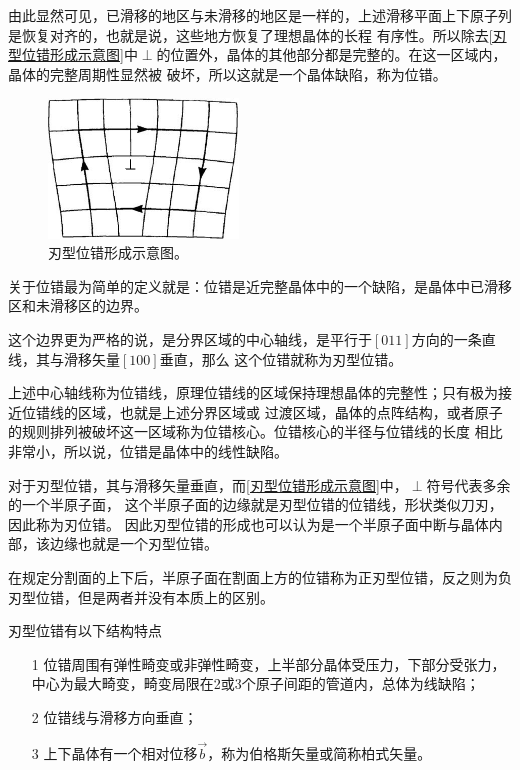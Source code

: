                 由此显然可见，已滑移的地区与未滑移的地区是一样的，上述滑移平面上下原子列是恢复对齐的，也就是说，这些地方恢复了理想晶体的长程
                有序性。所以除去\autoref{刃型位错形成示意图}中$\perp$的位置外，晶体的其他部分都是完整的。在这一区域内，晶体的完整周期性显然被
                破坏，所以这就是一个晶体缺陷，称为位错。
                \begin{figure}[ht]
                    \centering
                    \includegraphics[width=0.45\textwidth]{fig/b_edge_dislocation.eps}
                    \caption{刃型位错形成示意图。}
                    \label{刃型位错形成示意图}
                \end{figure}

                关于位错最为简单的定义就是：位错是近完整晶体中的一个缺陷，是晶体中已滑移区和未滑移区的边界。
                
                这个边界更为严格的说，是分界区域的中心轴线，是平行于$[011]$方向的一条直线，其与滑移矢量$[100]$垂直，那么
                这个位错就称为刃型位错。

                上述中心轴线称为位错线，原理位错线的区域保持理想晶体的完整性；只有极为接近位错线的区域，也就是上述分界区域或
                过渡区域，晶体的点阵结构，或者原子的规则排列被破坏这一区域称为位错核心。位错核心的半径与位错线的长度
                相比非常小，所以说，位错是晶体中的线性缺陷。

                对于刃型位错，其与滑移矢量垂直，而\autoref{刃型位错形成示意图}中，$\perp$符号代表多余的一个半原子面，
                这个半原子面的边缘就是刃型位错的位错线，形状类似刀刃，因此称为刃位错。
                因此刃型位错的形成也可以认为是一个半原子面中断与晶体内部，该边缘也就是一个刃型位错。

                在规定分割面的上下后，半原子面在割面上方的位错称为正刃型位错，反之则为负刃型位错，但是两者并没有本质上的区别。

                刃型位错有以下结构特点
                \begin{itemize}
                    \item[1] 位错周围有弹性畸变或非弹性畸变，上半部分晶体受压力，下部分受张力，中心为最大畸变，畸变局限在2或3个原子间距的管道内，总体为线缺陷；
                    \item[2] 位错线与滑移方向垂直；
                    \item[3] 上下晶体有一个相对位移$\vec{b}$，称为伯格斯矢量或简称柏式矢量。
                \end{itemize}
